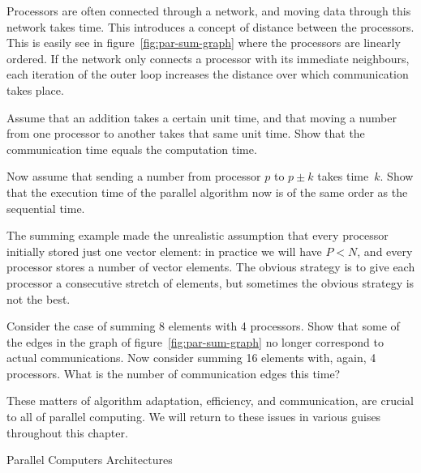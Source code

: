 Processors are often connected through a network, and moving data
through this network takes time. This introduces a concept of distance
between the processors. This is easily see in figure~\ref{fig:par-sum-graph}
where the
processors are linearly ordered. If the network only connects a
processor with its immediate neighbours,  each iteration of the
outer loop increases the distance over which communication takes
place.

\begin{exercise}
  \label{ex:summing0}
  Assume that an addition takes a certain unit time, and that moving a
  number from one processor to another takes that same unit time. Show
  that the communication time equals the computation time.

  Now assume that sending a number from processor $p$ to $p\pm k$
  takes time~$k$. Show that the execution time of the parallel
  algorithm now is of the same order as the sequential time.
\end{exercise}

The summing example made the unrealistic assumption that every
processor initially stored just one vector element: in practice we will
have $P<N$, and every processor stores a number of vector
elements. The obvious strategy is to give each processor a consecutive
stretch of elements, but sometimes the obvious strategy is not the
best.

\begin{exercise}
  Consider the case of summing 8 elements with 4 processors. Show that
  some of the edges in the graph of figure~\ref{fig:par-sum-graph} no
  longer correspond to actual communications. 
  Now consider summing 16 elements with, again, 4 processors. What is
  the number of communication edges this time?
\end{exercise}

These matters of algorithm adaptation, efficiency, and communication,
are crucial to all of parallel computing. We will return to these
issues in various guises throughout this chapter.

 {Parallel Computers Architectures}


